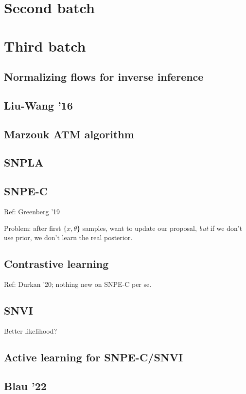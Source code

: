 \documentclass[notitlepage,openany,11pt]{report}
\theoremstyle{plain}%
\numberwithin{equation}{section}
\begin{document}
\section{Second batch}

\section{Third batch}

\subsection{Normalizing flows for inverse inference}
\subsection{Liu-Wang '16}
\subsection{Marzouk ATM algorithm}
\subsection{SNPLA}
\subsection{SNPE-C}
Ref: Greenberg '19

Problem: after first $\{x, \theta\}$ samples, want to update our proposal, \emph{but} if we don't use prior, we don't learn the real posterior.

\subsection{Contrastive learning}
Ref: Durkan '20; nothing new on SNPE-C per se.

\subsection{SNVI}
Better likelihood?

\subsection{Active learning for SNPE-C/SNVI}

\subsection{Blau '22}
\end{document}
